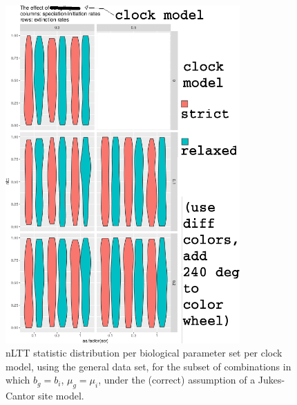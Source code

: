 \documentclass{article}
\begin{document}
\begin{figure}[!htbp]
  \includegraphics[width=0.8\textwidth]{fig_clock_model.png}
  \caption{
    nLTT statistic distribution per biological parameter set per clock model,
    using the general data set, 
    for the subset of combinations in which $b_g = b_i$, $\mu_g = \mu_i$, 
    under the (correct) assumption of a Jukes-Cantor site model.
  }
\end{figure}
\end{document}
